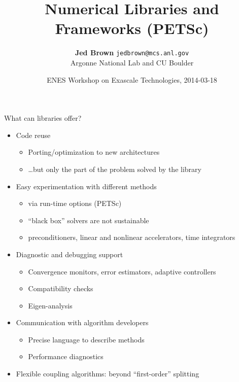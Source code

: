 \documentclass{beamer}
\title{Numerical Libraries and Frameworks (PETSc)}
\author{{\bf Jed Brown} \texttt{jedbrown@mcs.anl.gov} \\
  Argonne National Lab and CU Boulder
}
\date{ENES Workshop on Exascale Technologies, 2014-03-18}
\begin{document}
\lstset{language=C}
\normalem

\begin{frame}
  \titlepage
\end{frame}

\begin{frame}{What can libraries offer?}
  \begin{itemize}
  \item Code reuse
    \begin{itemize}
    \item Porting/optimization to new architectures
    \item \ldots but only the part of the problem solved by the library
    \end{itemize}
  \item Easy experimentation with different methods
    \begin{itemize}
    \item via run-time options (PETSc)
    \item ``black box'' solvers are not sustainable
    \item preconditioners, linear and nonlinear accelerators, time integrators
    \end{itemize}
  \item Diagnostic and debugging support
    \begin{itemize}
    \item Convergence monitors, error estimators, adaptive controllers
    \item Compatibility checks
    \item Eigen-analysis
    \end{itemize}
  \item Communication with algorithm developers
    \begin{itemize}
    \item Precise language to describe methods
    \item Performance diagnostics
    \end{itemize}
  \item Flexible coupling algorithms: beyond ``first-order'' splitting
  \end{itemize}
\end{frame}
\end{document}

